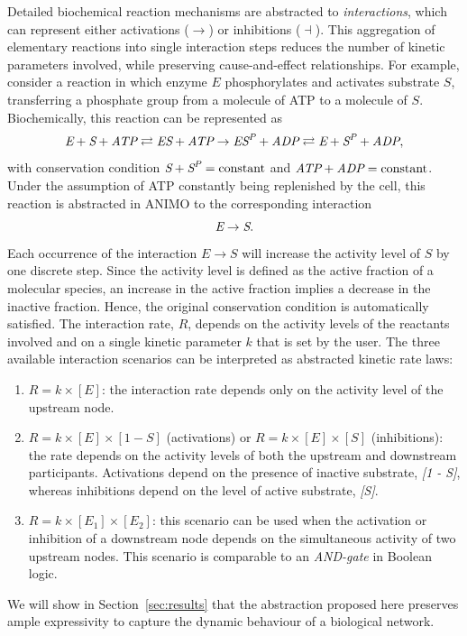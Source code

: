 \documentclass{bmcart}
\begin{document}
Detailed biochemical reaction mechanisms are abstracted to \emph{interactions}, which can 
represent either activations ($\rightarrow$) or inhibitions ($\dashv$\hspace{0.1em}). 
This aggregation of elementary reactions into single interaction steps reduces the number of kinetic 
parameters involved, while preserving cause-and-effect relationships.
For example, consider a reaction in which enzyme $E$ phosphorylates and activates substrate $S$, 
transferring a phosphate group from a molecule of ATP to a molecule of $S$. Biochemically, this reaction 
can be represented as
$$
\mbox{\it E} + \mbox{\it S} + \mbox{\it ATP} \rightleftarrows \mbox{\it ES} + \mbox{\it ATP} \rightarrow \mbox{\it ES}^{\mbox{\scriptsize \it P}} + \mbox{\it ADP} \rightleftarrows \mbox{\it E} + \mbox{\it S}^{\mbox{\scriptsize\it P}} + \mbox{\it ADP},
$$
with conservation condition $\mbox{\it S} + \mbox{\it S}^{\mbox{\scriptsize\it P}} = \mbox{constant}$ and $\mbox{\it ATP} + \mbox{\it ADP} = \mbox{constant}$.\\
Under the assumption of ATP constantly being replenished by the cell, this reaction is abstracted in ANIMO to the corresponding interaction
$$
\mbox{\it E} \rightarrow \mbox{\it S}.
$$
Each occurrence of the interaction $E \rightarrow S$ will increase the activity level of $S$ by one discrete step. 
Since the activity level is defined as the active fraction of a molecular species, an increase in the active fraction
implies a decrease in the inactive fraction. Hence, the original conservation condition is automatically  
satisfied.
The interaction rate, $R$, depends on the activity levels of the reactants involved and on a single kinetic
parameter $k$ that is set by the user. 
The three available interaction scenarios can be interpreted as abstracted kinetic rate laws:
\begin{enumerate}
  \item $R = k \times [E]$: the interaction rate depends only on the activity level of the upstream node.
  \item $R = k \times [E] \times [1 - S]$ (activations) or $R = k \times [E] \times [S]$ (inhibitions): the rate 
  depends on the activity levels of both the upstream and downstream participants. Activations depend on the 
  presence of inactive substrate, \emph{[1 - S]}, whereas inhibitions depend on the level of active substrate,
  \emph{[S]}.
  \item $R = k \times [E_1] \times [E_2]$: this scenario can be used when the activation or inhibition
  of a downstream node depends on the simultaneous activity of two upstream nodes. This scenario is comparable to an
  \emph{AND-gate} in Boolean logic.
\end{enumerate}
We will show in Section~\ref{sec:results} that the abstraction proposed here preserves ample
expressivity to capture the dynamic behaviour of a biological network. 
\end{document}
